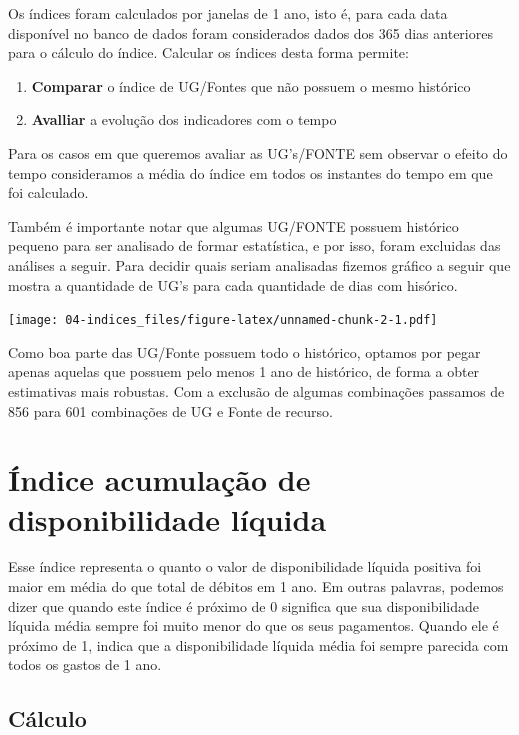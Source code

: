 \documentclass[
]{book}
\providecommand{\tightlist}{%
  \setlength{\itemsep}{0pt}\setlength{\parskip}{0pt}}
\begin{document}
Os índices foram calculados por janelas de 1 ano, isto é, para cada data disponível no banco de dados foram considerados dados dos 365 dias anteriores para o cálculo do índice. Calcular os índices desta forma permite:

\begin{enumerate}
\def\labelenumi{\arabic{enumi}.}
\tightlist
\item
  \textbf{Comparar} o índice de UG/Fontes que não possuem o mesmo histórico
\item
  \textbf{Avalliar} a evolução dos indicadores com o tempo
\end{enumerate}

Para os casos em que queremos avaliar as UG's/FONTE sem observar o efeito do tempo consideramos a média do índice em todos os instantes do tempo em que foi calculado.

Também é importante notar que algumas UG/FONTE possuem histórico pequeno para ser analisado de formar estatística, e por isso, foram excluidas das análises a seguir. Para decidir quais seriam analisadas fizemos gráfico a seguir que mostra a quantidade de UG's para cada quantidade de dias com hisórico.

\texttt{[image: 04-indices\_files/figure-latex/unnamed-chunk-2-1.pdf]}

Como boa parte das UG/Fonte possuem todo o histórico, optamos por pegar apenas aquelas que possuem pelo menos 1 ano de histórico, de forma a obter estimativas mais robustas. Com a exclusão de algumas combinações passamos de 856 para 601 combinações de UG e Fonte de recurso.

\hypertarget{uxedndice-acumulauxe7uxe3o-de-disponibilidade-luxedquida}{%
\section{Índice acumulação de disponibilidade líquida}\label{uxedndice-acumulauxe7uxe3o-de-disponibilidade-luxedquida}}

Esse índice representa o quanto o valor de disponibilidade líquida positiva foi maior em média do que total de débitos em 1 ano. Em outras palavras, podemos dizer que quando este índice é próximo de 0 significa que sua disponibilidade líquida média sempre foi muito menor do que os seus pagamentos. Quando ele é próximo de 1, indica que a disponibilidade líquida média foi sempre parecida com todos os gastos de 1 ano.

\hypertarget{cuxe1lculo}{%
\subsection{Cálculo}\label{cuxe1lculo}}
\end{document}
